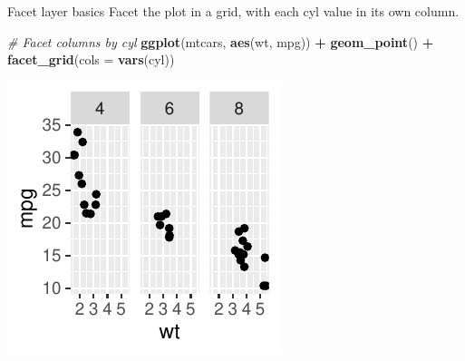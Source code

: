 \documentclass[
  ignorenonframetext,
]{beamer}
\newenvironment{Shaded}{\begin{snugshade}}{\end{snugshade}}
\newcommand{\AttributeTok}[1]{\textcolor[rgb]{0.13,0.29,0.53}{#1}}
\newcommand{\CommentTok}[1]{\textcolor[rgb]{0.56,0.35,0.01}{\textit{#1}}}
\newcommand{\FunctionTok}[1]{\textcolor[rgb]{0.13,0.29,0.53}{\textbf{#1}}}
\newcommand{\NormalTok}[1]{#1}
\newcommand{\SpecialCharTok}[1]{\textcolor[rgb]{0.81,0.36,0.00}{\textbf{#1}}}
\begin{document}
\begin{frame}[fragile]{Facet layer basics}
\label{facet-layer-basics-4}
Facet the plot in a grid, with each cyl value in its own column.


\begin{Shaded}
\begin{Highlighting}[]
\CommentTok{\# Facet columns by cyl}
\FunctionTok{ggplot}\NormalTok{(mtcars, }\FunctionTok{aes}\NormalTok{(wt, mpg)) }\SpecialCharTok{+} \FunctionTok{geom\_point}\NormalTok{() }\SpecialCharTok{+} \FunctionTok{facet\_grid}\NormalTok{(}\AttributeTok{cols =} \FunctionTok{vars}\NormalTok{(cyl))}
\end{Highlighting}
\end{Shaded}

\begin{center}\includegraphics[width=0.5\linewidth]{Figs/unnamed-chunk-74-1} \end{center}
\end{frame}
\end{document}
